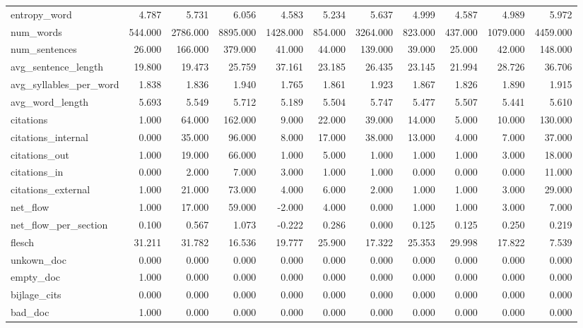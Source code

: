 \begin{tabular}{lrrrrrrrrrr}
\cline{1-11}
entropy\_word & 4.787 & 5.731 & 6.056 & 4.583 & 5.234 & 5.637 & 4.999 & 4.587 & 4.989 & 5.972 \\
\cline{1-11}
num\_words & 544.000 & 2786.000 & 8895.000 & 1428.000 & 854.000 & 3264.000 & 823.000 & 437.000 & 1079.000 & 4459.000 \\
\cline{1-11}
num\_sentences & 26.000 & 166.000 & 379.000 & 41.000 & 44.000 & 139.000 & 39.000 & 25.000 & 42.000 & 148.000 \\
\cline{1-11}
avg\_sentence\_length & 19.800 & 19.473 & 25.759 & 37.161 & 23.185 & 26.435 & 23.145 & 21.994 & 28.726 & 36.706 \\
\cline{1-11}
avg\_syllables\_per\_word & 1.838 & 1.836 & 1.940 & 1.765 & 1.861 & 1.923 & 1.867 & 1.826 & 1.890 & 1.915 \\
\cline{1-11}
avg\_word\_length & 5.693 & 5.549 & 5.712 & 5.189 & 5.504 & 5.747 & 5.477 & 5.507 & 5.441 & 5.610 \\
\cline{1-11}
citations & 1.000 & 64.000 & 162.000 & 9.000 & 22.000 & 39.000 & 14.000 & 5.000 & 10.000 & 130.000 \\
\cline{1-11}
citations\_internal & 0.000 & 35.000 & 96.000 & 8.000 & 17.000 & 38.000 & 13.000 & 4.000 & 7.000 & 37.000 \\
\cline{1-11}
citations\_out & 1.000 & 19.000 & 66.000 & 1.000 & 5.000 & 1.000 & 1.000 & 1.000 & 3.000 & 18.000 \\
\cline{1-11}
citations\_in & 0.000 & 2.000 & 7.000 & 3.000 & 1.000 & 1.000 & 0.000 & 0.000 & 0.000 & 11.000 \\
\cline{1-11}
citations\_external & 1.000 & 21.000 & 73.000 & 4.000 & 6.000 & 2.000 & 1.000 & 1.000 & 3.000 & 29.000 \\
\cline{1-11}
net\_flow & 1.000 & 17.000 & 59.000 & -2.000 & 4.000 & 0.000 & 1.000 & 1.000 & 3.000 & 7.000 \\
\cline{1-11}
net\_flow\_per\_section & 0.100 & 0.567 & 1.073 & -0.222 & 0.286 & 0.000 & 0.125 & 0.125 & 0.250 & 0.219 \\
\cline{1-11}
flesch & 31.211 & 31.782 & 16.536 & 19.777 & 25.900 & 17.322 & 25.353 & 29.998 & 17.822 & 7.539 \\
\cline{1-11}
unkown\_doc & 0.000 & 0.000 & 0.000 & 0.000 & 0.000 & 0.000 & 0.000 & 0.000 & 0.000 & 0.000 \\
\cline{1-11}
empty\_doc & 1.000 & 0.000 & 0.000 & 0.000 & 0.000 & 0.000 & 0.000 & 0.000 & 0.000 & 0.000 \\
\cline{1-11}
bijlage\_cits & 0.000 & 0.000 & 0.000 & 0.000 & 0.000 & 0.000 & 0.000 & 0.000 & 0.000 & 0.000 \\
\cline{1-11}
bad\_doc & 1.000 & 0.000 & 0.000 & 0.000 & 0.000 & 0.000 & 0.000 & 0.000 & 0.000 & 0.000 \\
\cline{1-11}
\bottomrule
\end{tabular}
